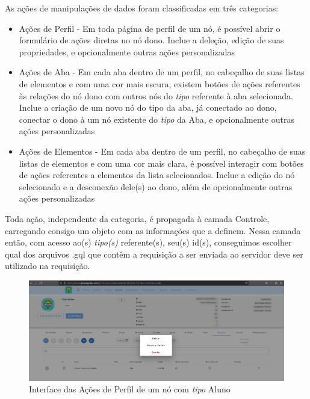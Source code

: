 As ações de manipulações de dados foram classificadas em três categorias:
\begin{itemize}
    \item Ações de Perfil - Em toda página de perfil de um nó, é possível abrir o formulário de ações diretas no nó dono. Inclue a deleção, edição de suas propriedades, e opcionalmente outras ações personalizadas
    \item Ações de Aba - Em cada aba dentro de um perfil, no cabeçalho de suas listas de elementos e com uma cor mais escura, existem botões de ações referentes às relações do nó dono com outros nós do \textit{tipo} referente à aba selecionada. Inclue a criação de um novo nó do tipo da aba, já conectado ao dono, conectar o dono à um nó existente do \textit{tipo} da Aba, e opcionalmente outras ações personalizadas
    \item Ações de Elementos - Em cada aba dentro de um perfil, no cabeçalho de suas listas de elementos e com uma cor mais clara, é possível interagir com botões de ações referentes a elementos da lista selecionados. Inclue a edição do nó selecionado e a desconexão dele(s) ao dono, além de opcionalmente outras ações personalizadas
\end{itemize}
Toda ação, independente da categoria, é propagada à camada Controle, carregando consigo um objeto com as informações que a definem. Nessa camada então, com acesso ao(s) \textit{tipo(s)} referente(s), seu(s) id(s), conseguimos escolher qual dos arquivos .gql que contêm a requisição a ser enviada ao servidor deve ser utilizado na requisição.
\begin{figure}
    \centering
    \includegraphics[width=1\linewidth]{Imagens/chap04/front-profile-actions.png}
    \caption{Interface das Ações de Perfil de um nó com \textit{tipo} Aluno}
    \label{fig:front-profile-actions}
\end{figure}

